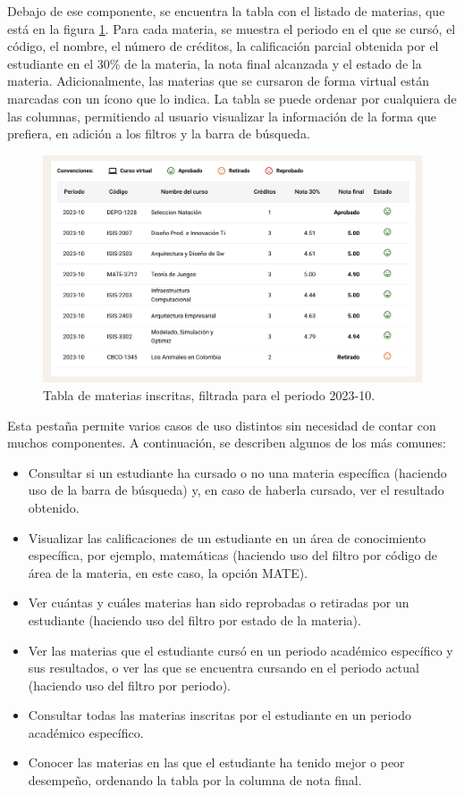 Debajo de ese componente, se encuentra la tabla con el listado de materias, que está en la figura \ref{fig:tabla_materias}. Para cada materia, se muestra el periodo en el que se cursó, el código, el nombre, el número de créditos, la calificación parcial obtenida por el estudiante en el 30\% de la materia, la nota final alcanzada y el estado de la materia. Adicionalmente, las materias que se cursaron de forma virtual están marcadas con un ícono que lo indica. La tabla se puede ordenar por cualquiera de las columnas, permitiendo al usuario visualizar la información de la forma que prefiera, en adición a los filtros y la barra de búsqueda.

\begin{figure}[H]
	\includegraphics[width=\textwidth]{assets/nes/tabla_materias.png}
	\caption{Tabla de materias inscritas, filtrada para el periodo 2023-10.}
	\label{fig:tabla_materias}
\end{figure}

Esta pestaña permite varios casos de uso distintos sin necesidad de contar con muchos componentes. A continuación, se describen algunos de los más comunes:
\begin{itemize}
	\item Consultar si un estudiante ha cursado o no una materia específica (haciendo uso de la barra de búsqueda) y, en caso de haberla cursado, ver el resultado obtenido.
	\item Visualizar las calificaciones de un estudiante en un área de conocimiento específica, por ejemplo, matemáticas (haciendo uso del filtro por código de área de la materia, en este caso, la opción MATE).
	\item Ver cuántas y cuáles materias han sido reprobadas o retiradas por un estudiante (haciendo uso del filtro por estado de la materia).
	\item Ver las materias que el estudiante cursó en un periodo académico específico y sus resultados, o ver las que se encuentra cursando en el periodo actual (haciendo uso del filtro por periodo).
	\item Consultar todas las materias inscritas por el estudiante en un periodo académico específico.
	\item Conocer las materias en las que el estudiante ha tenido mejor o peor desempeño, ordenando la tabla por la columna de nota final.
\end{itemize}

